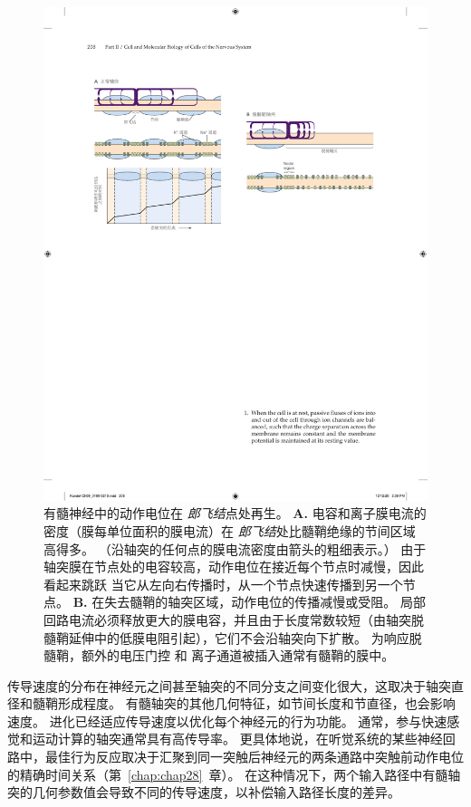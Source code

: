 \begin{figure}[htbp]
	\centering
	\includegraphics[width=1.0\linewidth]{chap09/fig_9_13}
	\caption{有髓神经中的动作电位在 \textit{郎飞结}点处再生。
		\textbf{A.} 电容和离子膜电流的密度（膜每单位面积的膜电流）在 \textit{郎飞结}处比髓鞘绝缘的节间区域高得多。
		（沿轴突的任何点的膜电流密度由箭头的粗细表示。）
		由于轴突膜在节点处的电容较高，动作电位在接近每个节点时减慢，因此看起来跳跃 当它从左向右传播时，从一个节点快速传播到另一个节点。
		\textbf{B.} 在失去髓鞘的轴突区域，动作电位的传播减慢或受阻。
		局部回路电流必须释放更大的膜电容，并且由于长度常数较短（由轴突脱髓鞘延伸中的低膜电阻引起），它们不会沿轴突向下扩散。
		为响应脱髓鞘，额外的电压门控  和  离子通道被插入通常有髓鞘的膜中。}
	\label{fig:9_13}
\end{figure}


传导速度的分布在神经元之间甚至轴突的不同分支之间变化很大，这取决于轴突直径和髓鞘形成程度。
有髓轴突的其他几何特征，如节间长度和节直径，也会影响速度。
进化已经适应传导速度以优化每个神经元的行为功能。
通常，参与快速感觉和运动计算的轴突通常具有高传导率。
更具体地说，在听觉系统的某些神经回路中，最佳行为反应取决于汇聚到同一突触后神经元的两条通路中突触前动作电位的精确时间关系（第~\ref{chap:chap28}~章）。
在这种情况下，两个输入路径中有髓轴突的几何参数值会导致不同的传导速度，以补偿输入路径长度的差异。


